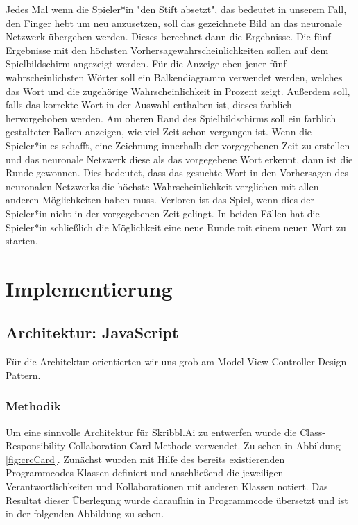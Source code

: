\documentclass[11pt]{article}
\begin{document}
Jedes Mal wenn die Spieler*in "den Stift absetzt", das bedeutet in unserem Fall, den Finger hebt um neu anzusetzen, soll das gezeichnete Bild an das neuronale Netzwerk übergeben werden. Dieses berechnet dann die Ergebnisse. Die fünf Ergebnisse mit den höchsten Vorhersagewahrscheinlichkeiten sollen auf dem Spielbildschirm angezeigt werden. Für die Anzeige eben jener fünf wahrscheinlichsten Wörter soll ein Balkendiagramm verwendet werden, welches das Wort und die zugehörige Wahrscheinlichkeit in Prozent zeigt. Außerdem soll, falls das korrekte Wort in der Auswahl enthalten ist, dieses farblich hervorgehoben werden. Am oberen Rand des Spielbildschirms soll ein farblich gestalteter Balken anzeigen, wie viel Zeit schon vergangen ist. Wenn die Spieler*in es schafft, eine  Zeichnung innerhalb der vorgegebenen Zeit zu erstellen und das neuronale Netzwerk diese als das vorgegebene Wort erkennt, dann ist die Runde gewonnen. Dies bedeutet, dass das gesuchte Wort in den Vorhersagen des neuronalen Netzwerks die höchste Wahrscheinlichkeit verglichen mit allen anderen Möglichkeiten haben muss. Verloren ist das Spiel, wenn dies der Spieler*in nicht in der vorgegebenen Zeit gelingt. 
In beiden Fällen hat die Spieler*in schließlich die Möglichkeit eine neue Runde mit einem neuen Wort zu starten.

\section{Implementierung}
\subsection{Architektur: JavaScript}
Für die Architektur orientierten wir uns grob am Model View Controller Design Pattern.
\subsubsection{Methodik}
Um eine sinnvolle Architektur für Skribbl.Ai zu entwerfen wurde die Class-Responsibility-Collaboration Card Methode verwendet. Zu sehen in Abbildung \ref{fig:crcCard}. Zunächst wurden mit Hilfe des bereits existierenden Programmcodes Klassen definiert und anschließend die jeweiligen Verantwortlichkeiten und Kollaborationen mit anderen Klassen notiert. Das Resultat dieser Überlegung wurde daraufhin in Programmcode übersetzt und ist in der folgenden Abbildung zu sehen.
\end{document}
